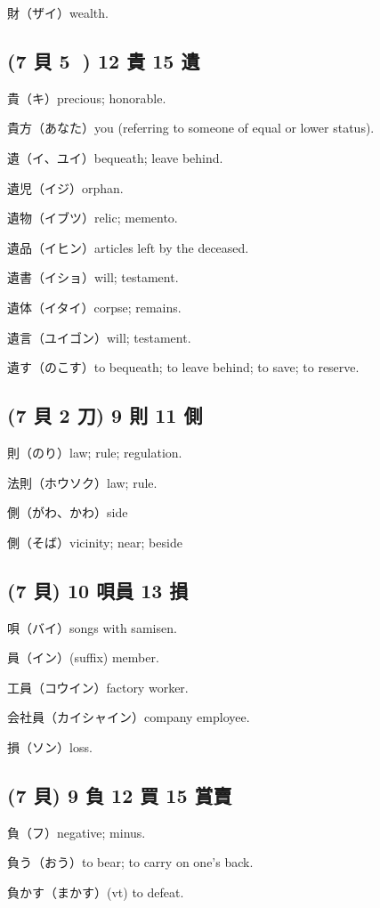 財（ザイ）wealth.

\subsection{(7 貝 5 𠀐) 12 貴 15 遺}

貴（キ）precious; honorable.

貴方（あなた）you (referring to someone of equal or lower status).

遺（イ、ユイ）bequeath; leave behind.

遺児（イジ）orphan.

遺物（イブツ）relic; memento.

遺品（イヒン）articles left by the deceased.

遺書（イショ）will; testament.

遺体（イタイ）corpse; remains.

遺言（ユイゴン）will; testament.

遺す（のこす）to bequeath; to leave behind; to save; to reserve.

\subsection{(7 貝 2 刀) 9 則 11 側}

則（のり）law; rule; regulation.

法則（ホウソク）law; rule.

側（がわ、かわ）side

側（そば）vicinity; near; beside

\subsection{(7 貝) 10 唄員 13 損}

唄（バイ）songs with samisen.

員（イン）(suffix) member.

工員（コウイン）factory worker.

会社員（カイシャイン）company employee.

損（ソン）loss.

\subsection{(7 貝) 9 負 12 買 15 賞賣}

負（フ）negative; minus.

負う（おう）to bear; to carry on one's back.

負かす（まかす）(vt) to defeat.

